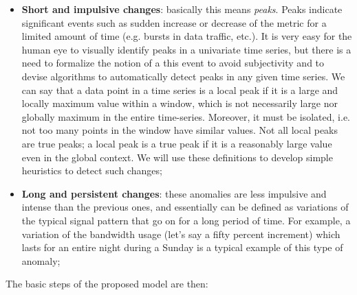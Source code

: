 \documentclass[12pt,a4paper,cucitura]{toptesi}
\begin{document}
\begin{itemize}

\item \textbf{Short and impulsive changes}: basically this means \emph{peaks}. Peaks indicate significant events such as sudden increase or decrease of the metric for a limited amount of time (e.g. bursts in data traffic, etc.). 
It is very easy for the human eye to visually identify peaks in a univariate time series, but there is a need to formalize the notion of a this event to avoid subjectivity and to devise algorithms to automatically detect peaks in any given time series.
We can say that a data point in a time series is a local peak if it is a large and locally maximum value within a window, which is not necessarily large nor globally maximum in the entire time-series. Moreover, it must be isolated, i.e. not too many points in the window have similar values. 
Not all local peaks are true peaks; a local peak is a true peak if it is a reasonably large value even in the global context.
We will use these definitions to develop simple heuristics to detect such changes;


\item \textbf{Long and persistent changes}: these anomalies are less impulsive and intense than the previous ones, and essentially can be defined as variations of the typical signal pattern that go on for a long period of time. For example, a variation of the bandwidth usage (let's say a fifty percent increment) which lasts for an entire night during a Sunday is a typical example of this type of anomaly;


\end{itemize}

The basic steps of the proposed model are then:
\end{document}
